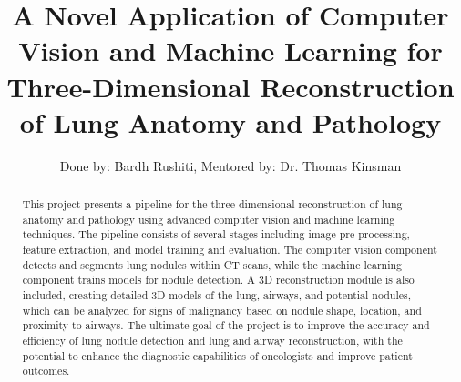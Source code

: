 \documentclass[12pt]{article}
\begin{document}
\title{A Novel Application of Computer Vision and  Machine Learning for Three-Dimensional Reconstruction of Lung Anatomy and Pathology}

\author{Done by: Bardh Rushiti, Mentored by: Dr. Thomas Kinsman}



\maketitle

\begin{abstract}
This project presents a pipeline for the three dimensional reconstruction of lung anatomy and pathology using advanced computer vision and machine learning techniques. The pipeline consists of several stages including image pre-processing, feature extraction, and model training and evaluation. The computer vision component detects and segments lung nodules within CT scans, while the machine learning component trains models for nodule detection. A 3D reconstruction module is also included, creating detailed 3D models of the lung, airways, and potential nodules, which can be analyzed for signs of malignancy based on nodule shape, location, and proximity to airways. The ultimate goal of the project is to improve the accuracy and efficiency of lung nodule detection and lung and airway reconstruction, with the potential to enhance the diagnostic capabilities of oncologists and improve patient outcomes.
\end{abstract}
\end{document}
